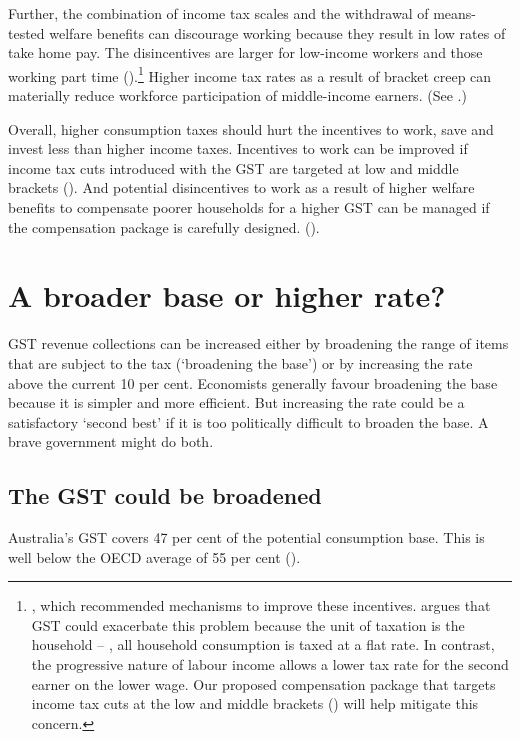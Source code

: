 Further, the combination of income tax scales and the withdrawal of means-tested welfare benefits can discourage working because they result in low rates of take home pay. The disincentives are larger for low-income workers and those working part time ().\footnote{\textcites{ProductivityCommission2015-Tax-and-transfer-incidence}{HardingNguVuPayneEtAl2009}{Reference-Group-On-Welfare-Reform-to-the-Minister-for-Social-Services-2015}, 
which recommended mechanisms to improve these incentives. \textcite{Apps2015} argues that GST could exacerbate this problem because the unit of taxation is the household – \ie, all household consumption is taxed at a flat rate. In contrast, the progressive nature of labour income allows a lower tax rate for the second earner on the lower wage. Our proposed compensation package that targets income tax cuts at the low and middle brackets () will help mitigate this concern.}  Higher income tax rates as a result of bracket creep can materially reduce workforce participation of middle-income earners. (See .)

Overall, higher consumption taxes should hurt the incentives to work, save and invest less than higher income taxes. Incentives to work can be improved if income tax cuts introduced with the GST are targeted at low and middle brackets (). And potential disincentives to work as a result of higher welfare benefits to compensate poorer households for a higher GST can be managed if the compensation package is carefully designed. (). 

\chapter{A broader base or higher rate?}\label{chapter:GST-2}
GST revenue collections can be increased either by broadening the range of items that are subject to the tax (‘broadening the base’) or by increasing the rate above the current 10 per cent. Economists generally favour broadening the base because it is simpler and more efficient. But increasing the rate could be a satisfactory ‘second best’ if it is too politically difficult to broaden the base. A brave government might do both. 

\section{The GST could be broadened}\label{sec:GST-2-1}
Australia’s GST covers 47 per cent of the potential consumption base. This is well below the OECD average of 55 per cent ().

